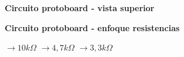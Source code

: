 \begin{enumerate}

        \begin{center} \textbf{Circuito protoboard - vista superior} \end{center}
        \begin{center} \textbf{Circuito protoboard - enfoque resistencias} \end{center}
         $\rightarrow 10k\Omega$
         $\rightarrow 4,7k\Omega$
         $\rightarrow 3,3k\Omega$
\end{enumerate}
\saltoPag{}
